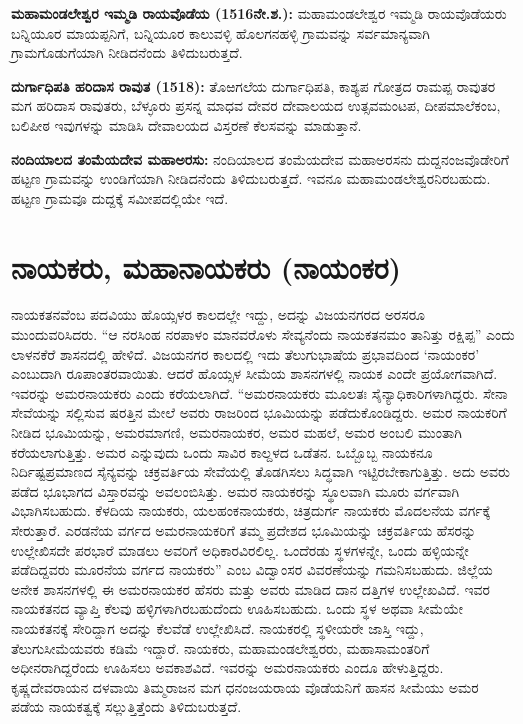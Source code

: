 \textbf{ಮಹಾಮಂಡಲೇಶ್ವರ ಇಮ್ಮಡಿ ರಾಯವೊಡೆಯ (15\general{\enginline{-}}16ನೇ.ಶ.):} ಮಹಾಮಂಡಲೇಶ್ವರ ಇಮ್ಮಡಿ ರಾಯವೊಡೆಯರು ಬನ್ನಿಯೂರ ಮಾಯಪ್ಪನಿಗೆ, ಬನ್ನಿಯೂರ ಕಾಲುವಳ್ಳಿ ಹೊಲಗನಹಳ್ಳಿ ಗ್ರಾಮವನ್ನು ಸರ್ವಮಾನ್ಯವಾಗಿ ಗ್ರಾಮಗೊಡುಗೆಯಾಗಿ ನೀಡಿದನೆಂದು ತಿಳಿದುಬರುತ್ತದೆ.

\textbf{ದುರ್ಗಾಧಿಪತಿ ಹರಿದಾಸ ರಾವುತ (1518):} ತೊಱಗಲೆಯ ದುರ್ಗಾಧಿಪತಿ, ಕಾಶ್ಯಪ ಗೋತ್ರದ ರಾಮಪ್ಪ ರಾವುತರ ಮಗ ಹರಿದಾಸ ರಾವುತರು, ಬೆಳ್ಳೂರು ಪ್ರಸನ್ನ ಮಾಧವ ದೇವರ ದೇವಾಲಯದ ಉತ್ಸವಮಂಟಪ, ದೀಪಮಾಲೆಕಂಬ, ಬಲಿಪೀಠ ಇವುಗಳನ್ನು ಮಾಡಿಸಿ ದೇವಾಲಯದ ವಿಸ್ತರಣೆ ಕೆಲಸವನ್ನು ಮಾಡುತ್ತಾನೆ.

\textbf{ನಂದಿಯಾಲದ ತಂಮೆಯದೇವ ಮಹಾಅರಸು:} ನಂದಿಯಾಲದ ತಂಮೆಯದೇವ ಮಹಾಅರಸನು ದುದ್ದ\break ನಂಜವೊಡೇರಿಗೆ ಹಟ್ಟಣ ಗ್ರಾಮವನ್ನು ಉಂಡಿಗೆಯಾಗಿ ನೀಡಿದನೆಂದು ತಿಳಿದುಬರುತ್ತದೆ. ಇವನೂ ಮಹಾಮಂಡಲೇಶ್ವರನಿರ\-ಬಹುದು. ಹಟ್ಟಣ ಗ್ರಾಮವೂ ದುದ್ದಕ್ಕೆ ಸಮೀಪದಲ್ಲಿಯೇ ಇದೆ.


\section{ನಾಯಕರು, ಮಹಾನಾಯಕರು (ನಾಯಂಕರ)}

ನಾಯಕತನವೆಂಬ ಪದವಿಯು ಹೊಯ್ಸಳರ ಕಾಲದಲ್ಲೇ ಇದ್ದು, ಅದನ್ನು ವಿಜಯನಗರದ ಅರಸರೂ ಮುಂದುವರಿಸಿದರು. “ಆ ನರಸಿಂಹ ನರಪಾಳಂ ಮಾನವರೊಳು ಸೇವ್ಯನೆಂದು ನಾಯಕತನಮಂ ತಾನಿತ್ತು ರಕ್ಷಿಪ್ಪ” ಎಂದು ಲಾಳನಕೆರೆ ಶಾಸನದಲ್ಲಿ ಹೇಳಿದೆ. ವಿಜಯನಗರ ಕಾಲದಲ್ಲಿ ಇದು ತೆಲುಗುಭಾಷೆಯ ಪ್ರಭಾವದಿಂದ ‘ನಾಯಂಕರ’ ಎಂಬುದಾಗಿ ರೂಪಾಂತರವಾಯಿತು. ಆದರೆ ಹೊಯ್ಸಳ ಸೀಮೆಯ ಶಾಸನಗಳಲ್ಲಿ ನಾಯಕ ಎಂದೇ ಪ್ರಯೋಗವಾಗಿದೆ. ಇವರನ್ನು ಅಮರನಾಯಕರು ಎಂದು ಕರೆಯಲಾಗಿದೆ. “ಅಮರನಾಯಕರು ಮೂಲತಃ ಸೈನ್ಯಾಧಿಕಾರಿಗಳಾಗಿದ್ದರು. ಸೇನಾ ಸೇವೆಯನ್ನು ಸಲ್ಲಿಸುವ ಷರತ್ತಿನ ಮೇಲೆ ಅವರು ರಾಜರಿಂದ ಭೂಮಿಯನ್ನು ಪಡೆದುಕೊಂಡಿದ್ದರು. ಅಮರ ನಾಯಕರಿಗೆ ನೀಡಿದ ಭೂಮಿಯನ್ನು, ಅಮರಮಾಗಣಿ, ಅಮರನಾಯಕರ, ಅಮರ ಮಹಲೆ, ಅಮರ ಅಂಬಲಿ ಮುಂತಾಗಿ ಕರೆಯಲಾಗುತ್ತಿತ್ತು. ಅಮರ ಎನ್ನುವುದು ಒಂದು ಸಾವಿರ ಕಾಲ್ದಳದ ಒಡೆತನ. ಒಬ್ಬೊಬ್ಬ ನಾಯಕನೂ ನಿರ್ದಿಷ್ಟಪ್ರಮಾಣದ ಸೈನ್ಯವನ್ನು ಚಕ್ರವರ್ತಿಯ ಸೇವೆಯಲ್ಲಿ ತೊಡಗಿಸಲು ಸಿದ್ಧವಾಗಿ ಇಟ್ಟಿರಬೇಕಾಗುತ್ತಿತ್ತು. ಅದು ಅವರು ಪಡೆದ ಭೂಭಾಗದ ವಿಸ್ತಾರವನ್ನು ಅವಲಂಬಿಸಿತ್ತು. ಅಮರ ನಾಯಕರನ್ನು ಸ್ಥೂಲವಾಗಿ ಮೂರು ವರ್ಗವಾಗಿ ವಿಭಾಗಿಸಬಹುದು. ಕೆಳದಿಯ ನಾಯಕರು, ಯಲಹಂಕನಾಯಕರು, ಚಿತ್ರದುರ್ಗ ನಾಯಕರು ಮೊದಲನೆಯ ವರ್ಗಕ್ಕೆ ಸೇರುತ್ತಾರೆ. ಎರಡನೆಯ ವರ್ಗದ ಅಮರನಾಯಕರಿಗೆ ತಮ್ಮ ಪ್ರದೇಶದ ಭೂಮಿಯನ್ನು ಚಕ್ರವರ್ತಿಯ ಹೆಸರನ್ನು ಉಲ್ಲೇಖಿಸದೇ ಪರಭಾರೆ ಮಾಡಲು ಅವರಿಗೆ ಅಧಿಕಾರವಿರಲಿಲ್ಲ. ಒಂದೆರಡು ಸ್ಥಳಗಳನ್ನೇ, ಒಂದು ಹಳ್ಳಿಯನ್ನೇ ಪಡೆದಿದ್ದವರು ಮೂರನೆಯ ವರ್ಗದ ನಾಯಕರು” ಎಂಬ ವಿದ್ವಾಂಸರ ವಿವರಣೆಯನ್ನು ಗಮನಿಸಬಹುದು. ಜಿಲ್ಲೆಯ ಅನೇಕ ಶಾಸನಗಳಲ್ಲಿ ಈ ಅಮರನಾಯಕರ ಹೆಸರು ಮತ್ತು ಅವರು ಮಾಡಿದ ದಾನ ದತ್ತಿಗಳ ಉಲ್ಲೇಖವಿದೆ. ಇವರ ನಾಯಕತನದ ವ್ಯಾಪ್ತಿ ಕೆಲವು ಹಳ್ಳಿಗಳಾಗಿರಬಹುದೆಂದು ಊಹಿಸಬಹುದು. ಒಂದು ಸ್ಥಳ ಅಥವಾ ಸೀಮೆಯೇ ನಾಯಕತನಕ್ಕೆ ಸೇರಿದ್ದಾಗ ಅದನ್ನು ಕೆಲವೆಡೆ ಉಲ್ಲೇಖಿಸಿದೆ. ನಾಯಕರಲ್ಲಿ ಸ್ಥಳೀಯರೇ ಜಾಸ್ತಿ ಇದ್ದು, ತೆಲುಗುಸೀಮೆಯವರು ಕಡಿಮೆ ಇದ್ದಾರೆ. ನಾಯಕರು, ಮಹಾಮಂಡಲೇಶ್ವರರು, ಮಹಾಸಾಮಂತರಿಗೆ ಅಧೀನರಾಗಿದ್ದರೆಂದು ಊಹಿಸಲು ಅವಕಾಶವಿದೆ. ಇವರನ್ನು ಅಮರನಾಯಕರು ಎಂದೂ ಹೇಳುತ್ತಿದ್ದರು. ಕೃಷ್ಣದೇವರಾಯನ ದಳವಾಯಿ ತಿಮ್ಮರಾಜನ ಮಗ ಧನಂಜಯರಾಯ ವೊಡೆಯನಿಗೆ ಹಾಸನ ಸೀಮೆಯು ಅಮರ ಪಡೆಯ ನಾಯಕತ್ವಕ್ಕೆ ಸಲ್ಲುತ್ತಿತ್ತೆಂದು ತಿಳಿದುಬರುತ್ತದೆ.

